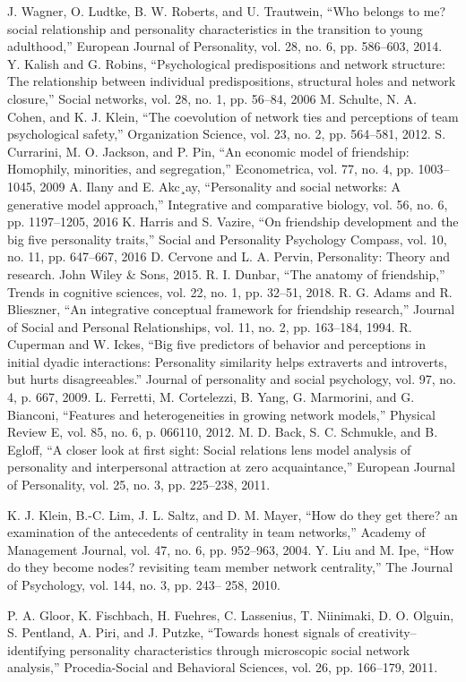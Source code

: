 \documentclass[runningheads]{llncs}
\begin{document}
\begin{thebibliography}{8}
J. Wagner, O. Ludtke, B. W. Roberts, and U. Trautwein, “Who belongs to me? social relationship and personality characteristics in the transition to young adulthood,” European Journal of Personality, vol. 28, no. 6,
pp. 586–603, 2014.
 Y. Kalish and G. Robins, “Psychological predispositions and network
structure: The relationship between individual predispositions, structural
holes and network closure,” Social networks, vol. 28, no. 1, pp. 56–84,
2006
M. Schulte, N. A. Cohen, and K. J. Klein, “The coevolution of network
ties and perceptions of team psychological safety,” Organization Science,
vol. 23, no. 2, pp. 564–581, 2012.
S. Currarini, M. O. Jackson, and P. Pin, “An economic model of friendship: Homophily, minorities, and segregation,” Econometrica, vol. 77,
no. 4, pp. 1003–1045, 2009
A. Ilany and E. Akc¸ay, “Personality and social networks: A generative
model approach,” Integrative and comparative biology, vol. 56, no. 6,
pp. 1197–1205, 2016
K. Harris and S. Vazire, “On friendship development and the big five
personality traits,” Social and Personality Psychology Compass, vol. 10,
no. 11, pp. 647–667, 2016
D. Cervone and L. A. Pervin, Personality: Theory and research. John Wiley \& Sons, 2015.
R. I. Dunbar, “The anatomy of friendship,” Trends in cognitive sciences, vol. 22, no. 1, pp. 32–51, 2018.
R. G. Adams and R. Blieszner, “An integrative conceptual framework
for friendship research,” Journal of Social and Personal Relationships,
vol. 11, no. 2, pp. 163–184, 1994.
R. Cuperman and W. Ickes, “Big five predictors of behavior and
perceptions in initial dyadic interactions: Personality similarity helps
extraverts and introverts, but hurts disagreeables.” Journal of personality
and social psychology, vol. 97, no. 4, p. 667, 2009.
L. Ferretti, M. Cortelezzi, B. Yang, G. Marmorini, and G. Bianconi,
“Features and heterogeneities in growing network models,” Physical
Review E, vol. 85, no. 6, p. 066110, 2012.
M. D. Back, S. C. Schmukle, and B. Egloff, “A closer look at first sight:
Social relations lens model analysis of personality and interpersonal attraction at zero acquaintance,” European Journal of Personality, vol. 25,
no. 3, pp. 225–238, 2011.

 K. J. Klein, B.-C. Lim, J. L. Saltz, and D. M. Mayer, “How do they get
there? an examination of the antecedents of centrality in team networks,”
Academy of Management Journal, vol. 47, no. 6, pp. 952–963, 2004.
 Y. Liu and M. Ipe, “How do they become nodes? revisiting team member
network centrality,” The Journal of Psychology, vol. 144, no. 3, pp. 243–
258, 2010.

P. A. Gloor, K. Fischbach, H. Fuehres, C. Lassenius, T. Niinimaki, D. O. Olguin, S. Pentland, A. Piri, and J. Putzke, “Towards honest signals of creativity–identifying personality characteristics through microscopic social network analysis,” Procedia-Social and Behavioral Sciences, vol. 26, pp. 166–179, 2011.
\end{thebibliography}
\end{document}
